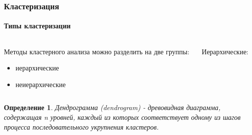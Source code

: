 \documentclass[xcolor=table]{beamer}
\newtheorem{defn}{Определение}
\begin{document}
\begin{frame}
  \frametitle{Кластеризация}
  \framesubtitle{Типы кластеризации}

  \begin{columns}
    \begin{column}{0.4\textwidth}
      Методы кластерного анализа можно разделить на две группы:
      \begin{itemize}
      \item иерархические
      \item неиерархические
      \end{itemize}
    \end{column}
    
    \begin{column}{0.6\textwidth}
      Иерархические:
    \end{column}
   
  \end{columns}
  \begin{defn}
    Дендрограмма (dendrogram) - древовидная диаграмма, содержащая n уровней, каждый из которых соответствует одному из шагов процесса последовательного укрупнения кластеров.
  \end{defn}
  
\end{frame}
\end{document}
